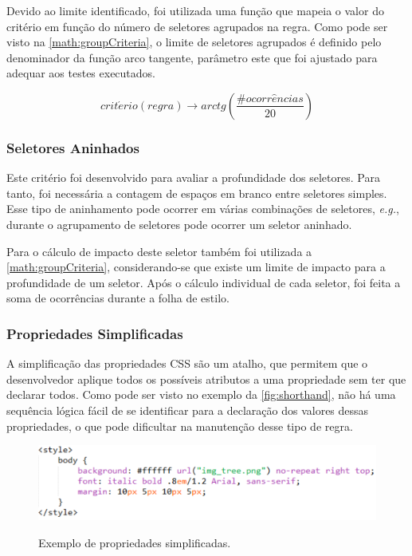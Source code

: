Devido ao limite identificado, foi utilizada uma função que mapeia o valor do critério em função do número de seletores agrupados na regra. Como pode ser visto na \autoref{math:groupCriteria}, o limite de seletores agrupados é definido pelo denominador da função arco tangente, parâmetro este que foi ajustado para adequar aos testes executados.

\begin{equation}
\label{math:groupCriteria}
	crit\acute{e}rio(regra) \rightarrow arctg\left(\frac{\#ocorr\hat{e}ncias}{20}\right)	
\end{equation}

\subsubsection{Seletores Aninhados}
Este critério foi desenvolvido para avaliar a profundidade dos seletores. Para tanto, foi necessária a contagem de espaços em branco entre seletores simples. Esse tipo de aninhamento pode ocorrer em várias combinações de seletores, \textit{e.g.}, durante o agrupamento de seletores pode ocorrer um seletor aninhado.

Para o cálculo de impacto deste seletor também foi utilizada a \autoref{math:groupCriteria}, considerando-se que existe um limite de impacto para a profundidade de um seletor. Após o cálculo individual de cada seletor, foi feita a soma de ocorrências durante a folha de estilo.

\subsubsection{Propriedades Simplificadas}
A simplificação das propriedades CSS são um atalho, que permitem que o desenvolvedor aplique todos os possíveis atributos a uma propriedade sem ter que declarar todos. Como pode ser visto no exemplo da \autoref{fig:shorthand}, não há uma sequência lógica fácil de se identificar para a declaração dos valores dessas propriedades, o que pode dificultar na manutenção desse tipo de regra.

\begin{figure}[!htb]
	\centering
	\caption{Exemplo de propriedades simplificadas.}
	\includegraphics[width=1\textwidth]{./04-figuras/shorthand_prop}
	\label{fig:shorthand}
\end{figure}

